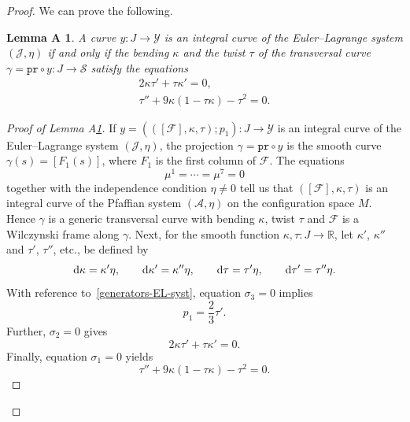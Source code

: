 \documentclass[pdftex]{sigma}
\numberwithin{equation}{section}
\newtheorem{lemmaA}{Lemma A\ignorespaces}
\def\S{\mathcal{S}}
\def\S{\mathcal{S}}
\begin{document}
\begin{proof}
We can prove the following.

\begin{lemmaA}\label{l:eqns-motion}
A curve $y\colon J \to \mathcal{Y}$ is an integral curve of the Euler--Lagrange system $(\mathcal{J}, \eta)$ if and only if
the bending $\kappa$ and the twist $\tau$ of the transversal curve $\gamma = \mathtt{pr}\circ y\colon J \to \S$
satisfy the equations
\begin{gather}
 2\kappa \tau' + \tau \kappa' = 0 ,\label{eqns-motion1} \\
 \tau'' + 9 \kappa(1 -\tau\kappa) - \tau^2 = 0\label{eqns-motion2} .
\end{gather}
\end{lemmaA}

\begin{proof}[Proof of Lemma A\ref{l:eqns-motion}]

If $y= (([\mathcal{F}], \kappa, \tau); p_1) \colon J \to \mathcal{Y}$ is an integral curve of the Euler--Lagrange system
$(\mathcal{J}, \eta)$,
the projection $\gamma = \mathtt{pr}\circ y$ is the smooth curve $\gamma(s) = [{F}_1(s)]$,
where ${F}_1$ is the first column of $\mathcal{F}$.
%
The equations
\[
\mu^1= \cdots= \mu^7 =0
\]
 together with the
independence condition $\eta\neq 0$ tell us that $([\mathcal{F}], \kappa, \tau)$
is an integral curve of the Pfaffian system $(\mathcal{A}, \eta)$ on the configuration space $M$.
Hence $\gamma$ is a generic transversal curve with bending $\kappa$, twist $\tau$ and $\mathcal{F}$
is a Wilczynski frame along $\gamma$.
%
%
Next, for the smooth function $\kappa, \tau\colon J \to \mathbb{R}$, let $\kappa'$, $\kappa''$ and $\tau'$, $\tau''$, etc.,
be defined by
\[
 {\rm d}\kappa = \kappa' \eta,\qquad {\rm d}\kappa' = \kappa''\eta, \qquad {\rm d}\tau = \tau' \eta, \qquad {\rm d}\tau' = \tau''\eta .
 \]
With reference to~\eqref{generators-EL-syst}, equation $\sigma_3 = 0$ implies
\[
 p_1 = \frac23 \tau' .
 \]
Further, $\sigma_2=0$ gives
\[
 2\kappa \tau' + \tau \kappa' = 0 .
 \]
%
Finally, equation $\sigma_1 =0$ yields
\[
 \tau'' + 9 \kappa(1 -\tau\kappa) - \tau^2 = 0 .
 \]
%
%


\end{proof}
\end{proof}
\end{document}
